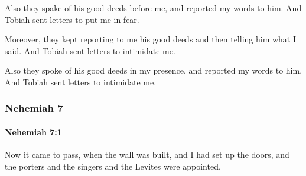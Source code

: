 			\begin{versebox}
					\item[BHS] 
					\item[LXX] 
					\item[ASV] Also they spake of his good deeds before me, and reported my words to him. And Tobiah sent letters to put me in fear.
					\item[NIV] Moreover, they kept reporting to me his good deeds and then telling him what I said. And Tobiah sent letters to intimidate me.
					\item[NRSV] Also they spoke of his good deeds in my presence, and reported my words to him. And Tobiah sent letters to intimidate me.
			\end{versebox}
	\subsubsection{Nehemiah 7} %
		\label{NEHEMIAH-7}

		\paragraph{Nehemiah 7:1} %
			\label{NEHEMIAH-7-1}

			Now it came to pass, when the wall was built, and I had set up the doors, and the porters and the singers and the Levites were appointed,

